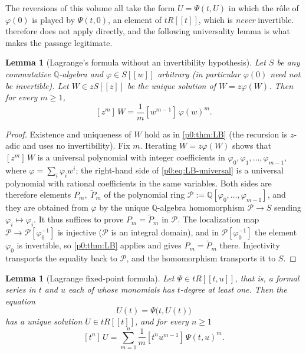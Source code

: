 \documentclass[11pt,a4paper,oneside]{book}
\theoremstyle{plain}
\newtheorem{lemma}[theorem]{Lemma}
\theoremstyle{definition}
\theoremstyle{remark}
\newcommand{\Rat}{\mathbb{Q}}
\newcommand{\Coef}[1]{[#1]\,}
\begin{document}
The reversions of this volume all take the form $U=\Psi(t,U)$ in which the
r\^ole of $\varphi(0)$ is played by $\Psi(t,0)$, an element of $tR[[t]]$, which
is \emph{never} invertible.   therefore does not apply
directly, and the following universality lemma is what makes the passage
legitimate.

\begin{lemma}[Lagrange's formula without an invertibility hypothesis]
\label{p0:lem:LB-universal}
Let $S$ be any commutative $\Rat$-algebra and $\varphi\in S[[w]]$
\emph{arbitrary} (in particular $\varphi(0)$ need not be invertible).  Let
$W\in zS[[z]]$ be the unique solution of $W=z\varphi(W)$.  Then for every
$m\ge1$,
\begin{equation}\label{p0:eq:LB-universal}
 \Coef{z^m}W=\frac1m\Coef{w^{m-1}}\varphi(w)^m .
\end{equation}
\end{lemma}

\begin{proof}
Existence and uniqueness of $W$ hold as in \cref{p0:thm:LB} (the recursion is
$z$-adic and uses no invertibility).  Fix $m$.  Iterating $W=z\varphi(W)$
shows that $\Coef{z^m}W$ is a universal polynomial with integer coefficients in
$\varphi_0,\varphi_1,\dots,\varphi_{m-1}$, where $\varphi=\sum_i\varphi_iw^i$;
the right-hand side of \eqref{p0:eq:LB-universal} is a universal polynomial
with rational coefficients in the same variables.  Both sides are therefore
elements $P_m,\;\widetilde P_m$ of the polynomial ring
$\mathcal P:=\Rat[\varphi_0,\dots,\varphi_{m-1}]$, and they are obtained from
$\varphi$ by the unique $\Rat$-algebra homomorphism
$\mathcal P\to S$ sending $\varphi_i\mapsto\varphi_i$.  It thus suffices to
prove $P_m=\widetilde P_m$ in $\mathcal P$.  The localization map
$\mathcal P\to\mathcal P[\varphi_0^{-1}]$ is injective ($\mathcal P$ is an
integral domain), and in $\mathcal P[\varphi_0^{-1}]$ the element $\varphi_0$
is invertible, so \cref{p0:thm:LB} applies and gives
$P_m=\widetilde P_m$ there.  Injectivity transports the equality back to
$\mathcal P$, and the homomorphism transports it to $S$.
\end{proof}

\begin{lemma}[Lagrange fixed-point formula]\label{p0:lem:lagrange-fp}
Let $\Psi\in tR[[t,u]]$, that is, a formal series in $t$ and $u$ each of whose
monomials has $t$-degree at least one.  Then the equation
\begin{equation}\label{p0:eq:fp-equation}
 U(t)=\Psi\bigl(t,U(t)\bigr)
\end{equation}
has a unique solution $U\in tR[[t]]$, and for every $n\ge1$
\begin{equation}\label{p0:eq:fp-coefficient}
 \Coef{t^n}U=\sum_{m=1}^{n}\frac1m\Coef{t^nu^{m-1}}\Psi(t,u)^m .
\end{equation}
\end{lemma}
\end{document}
